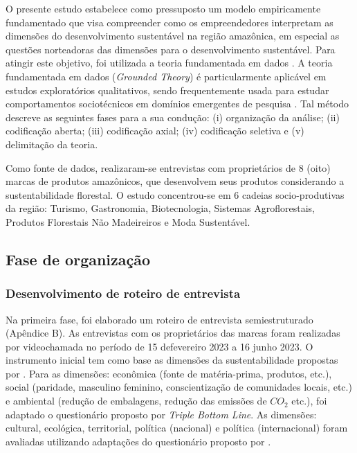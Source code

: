O presente estudo estabelece como pressuposto um modelo empiricamente fundamentado que visa compreender como os empreendedores interpretam as dimensões do desenvolvimento sustentável na região amazônica, em especial as questões norteadoras das dimensões para o desenvolvimento sustentável. Para atingir este objetivo, foi utilizada a teoria fundamentada em dados \cite{Strauss1987QualitativeScientists,Strauss1990BasicsResearch}. A teoria fundamentada em dados (\textit{Grounded Theory}) é particularmente aplicável em estudos exploratórios qualitativos, sendo frequentemente usada para estudar comportamentos sociotécnicos em domínios emergentes de pesquisa \cite{Foley2015UsingExperiences}. Tal método descreve as seguintes fases para a sua condução: (i) organização da análise; (ii) codificação aberta; (iii) codificação axial; (iv) codificação seletiva e (v) delimitação da teoria.

Como fonte de dados, realizaram-se entrevistas com proprietários de 8 (oito) marcas de produtos amazônicos, que desenvolvem seus produtos considerando a sustentabilidade florestal. O estudo concentrou-se em 6 cadeias socio-produtivas da região: Turismo, Gastronomia, Biotecnologia, Sistemas Agroflorestais, Produtos Florestais Não Madeireiros e Moda Sustentável.


\subsection{Fase de organização}
\subsubsection*{Desenvolvimento de roteiro de entrevista}

Na primeira fase, foi elaborado um roteiro de entrevista semiestruturado (Apêndice B). As entrevistas com os proprietários das marcas foram realizadas por videochamada no período de 15 defevereiro 2023 a 16 junho 2023. O instrumento inicial tem como base as dimensões da sustentabilidade propostas por . Para as dimensões: econômica (fonte de matéria-prima, produtos, etc.), social (paridade, masculino feminino, conscientização de comunidades locais, etc.) e ambiental (redução de embalagens, redução das emissões de $CO_2$ etc.), foi adaptado o questionário proposto por  \textit{Triple Bottom Line}. As dimensões: cultural, ecológica, territorial, política (nacional) e política (internacional) foram avaliadas utilizando adaptações do questionário proposto por .

